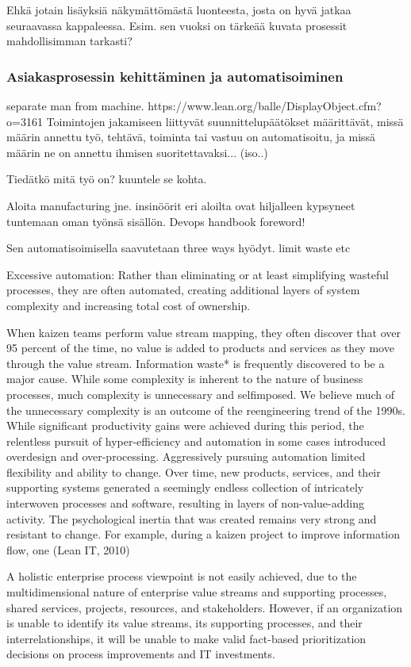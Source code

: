 \documentclass[finnish,12pt,a4paper,pdftex]{article}
\begin{document}
Ehkä jotain lisäyksiä näkymättömästä luonteesta, josta on hyvä jatkaa seuraavassa kappaleessa. Esim. sen vuoksi on tärkeää kuvata prosessit mahdollisimman tarkasti?

\subsubsection{Asiakasprosessin kehittäminen ja automatisoiminen}

separate man from machine. https://www.lean.org/balle/DisplayObject.cfm?o=3161 
Toimintojen jakamiseen liittyvät suunnittelupäätökset määrittävät, missä määrin annettu työ, tehtävä, toiminta tai vastuu on automatisoitu, ja missä määrin ne on annettu ihmisen suoritettavaksi... (iso..)

Tiedätkö mitä työ on? kuuntele se kohta.

Aloita manufacturing jne. 
insinöörit eri aloilta ovat hiljalleen kypsyneet tuntemaan oman työnsä sisällön. Devops handbook foreword!

Sen automatisoimisella saavutetaan three ways hyödyt. limit waste etc

Excessive automation: Rather than eliminating or at least simplifying
wasteful processes, they are often automated, creating additional
layers of system complexity and increasing total cost of ownership.


When kaizen teams perform value stream mapping, they often discover
that over 95 percent of the time, no value is added to products and services
as they move through the value stream. Information waste* is frequently
discovered to be a major cause. While some complexity is inherent to the
nature of business processes, much complexity is unnecessary and selfimposed.
We believe much of the unnecessary complexity is an outcome of
the reengineering trend of the 1990s. While significant productivity gains
were achieved during this period, the relentless pursuit of hyper-efficiency
and automation in some cases introduced overdesign and over-processing.
Aggressively pursuing automation limited flexibility and ability to change.
Over time, new products, services, and their supporting systems generated
a seemingly endless collection of intricately interwoven processes and
software, resulting in layers of non-value-adding activity. The psychological
inertia that was created remains very strong and resistant to change.
For example, during a kaizen project to improve information flow, one (Lean IT, 2010)

A holistic enterprise process viewpoint is not easily achieved, due to
the multidimensional nature of enterprise value streams and supporting
processes, shared services, projects, resources, and stakeholders.
However, if an organization is unable to identify its value streams, its
supporting processes, and their interrelationships, it will be unable to
make valid fact-based prioritization decisions on process improvements
and IT investments. 
\end{document}
